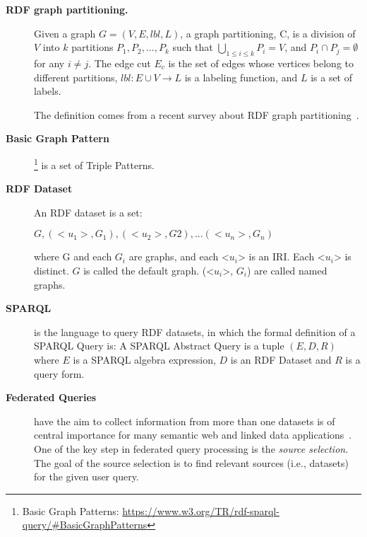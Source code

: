 \begin{description}
\item[\textbf{RDF graph partitioning.}]
Given a graph $G=(V,E, lbl, L)$, a graph partitioning, C, is a division of $V$ into $k$ partitions ${P_1,P_2,...,P_k}$ such that $\bigcup\limits_{1 \leq i \leq k}P_i=V$, and $P_i \cap P_j = \emptyset$ for any $i \neq j$. The edge cut $E_c$ is the set of edges whose vertices belong to different partitions, $lbl : E \cup V \rightarrow L$ is a labeling function, and $L$ is a set of labels. 

The definition comes from a recent survey about RDF graph partitioning~\cite{tomaszuk2015rdf}.

\item[\textbf{Basic Graph Pattern}]\footnote{Basic Graph Patterns: \url{https://www.w3.org/TR/rdf-sparql-query/#BasicGraphPatterns}} is a set of Triple Patterns\cite{fletcher2008algebra}.

\item[\textbf{RDF Dataset}]
An RDF dataset is a set:

${ G, (<u_1>, G_1), (<u_2>, G2), . . . (<u_n>, G_n) }$

where G and each $G_i$ are graphs, and each <$u_i$> is an IRI. Each <$u_i$> is distinct. $G$ is called the default graph. (<$u_i$>, $G_i$) are called named graphs.

\item[\textbf{SPARQL}] is the language to query RDF datasets, in which the formal definition of a SPARQL Query is:
A SPARQL Abstract Query is a tuple $(E, D, R)$ where $E$ is a SPARQL algebra expression, $D$ is an RDF Dataset and $R$ is a query form.

\item[\textbf{Federated Queries}] have the aim to collect information from more than one datasets is of central importance for many semantic web and linked data applications~\cite{saleem2013fostering,bigtcga2014}. One of the key step in federated query processing is the \emph{source selection}. The goal of the source selection is to find relevant sources (i.e., datasets) for the given user query.

\end{description}
